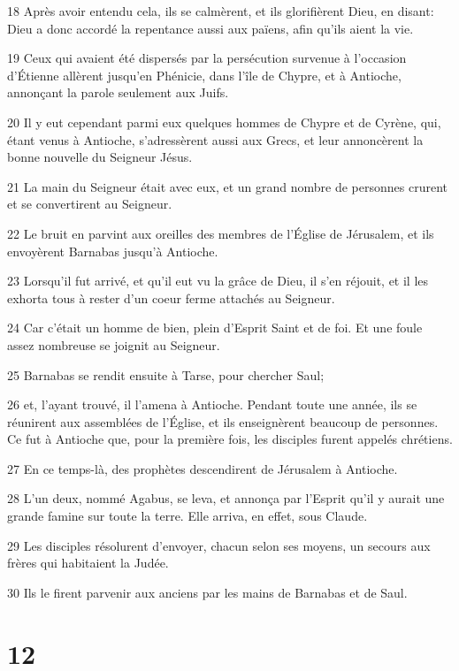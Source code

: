 \par 18 Après avoir entendu cela, ils se calmèrent, et ils glorifièrent Dieu, en disant: Dieu a donc accordé la repentance aussi aux païens, afin qu'ils aient la vie.
\par 19 Ceux qui avaient été dispersés par la persécution survenue à l'occasion d'Étienne allèrent jusqu'en Phénicie, dans l'île de Chypre, et à Antioche, annonçant la parole seulement aux Juifs.
\par 20 Il y eut cependant parmi eux quelques hommes de Chypre et de Cyrène, qui, étant venus à Antioche, s'adressèrent aussi aux Grecs, et leur annoncèrent la bonne nouvelle du Seigneur Jésus.
\par 21 La main du Seigneur était avec eux, et un grand nombre de personnes crurent et se convertirent au Seigneur.
\par 22 Le bruit en parvint aux oreilles des membres de l'Église de Jérusalem, et ils envoyèrent Barnabas jusqu'à Antioche.
\par 23 Lorsqu'il fut arrivé, et qu'il eut vu la grâce de Dieu, il s'en réjouit, et il les exhorta tous à rester d'un coeur ferme attachés au Seigneur.
\par 24 Car c'était un homme de bien, plein d'Esprit Saint et de foi. Et une foule assez nombreuse se joignit au Seigneur.
\par 25 Barnabas se rendit ensuite à Tarse, pour chercher Saul;
\par 26 et, l'ayant trouvé, il l'amena à Antioche. Pendant toute une année, ils se réunirent aux assemblées de l'Église, et ils enseignèrent beaucoup de personnes. Ce fut à Antioche que, pour la première fois, les disciples furent appelés chrétiens.
\par 27 En ce temps-là, des prophètes descendirent de Jérusalem à Antioche.
\par 28 L'un deux, nommé Agabus, se leva, et annonça par l'Esprit qu'il y aurait une grande famine sur toute la terre. Elle arriva, en effet, sous Claude.
\par 29 Les disciples résolurent d'envoyer, chacun selon ses moyens, un secours aux frères qui habitaient la Judée.
\par 30 Ils le firent parvenir aux anciens par les mains de Barnabas et de Saul.

\chapter{12}

